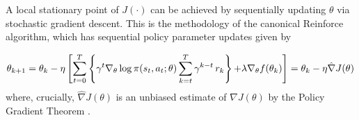 \documentclass[journal,onecolumn]{IEEEtran}
\newcommand{\thk}{\theta_k}
\newcommand{\thkk}{\theta_{k+1}}
\newcommand{\grad}{\nabla}
\newcommand{\gradn}{\hat{\nabla}}
\newcommand{\rew}{J}
\newcommand{\reals}{\mathbb{R}}
\newcommand{\CE}{\mathbb{E}}
\newcommand{\N}{\mathbb{N}}
\newcommand{\CS}{\mathcal{S}}
\newcommand{\CA}{\mathcal{A}}
\begin{document}



A local stationary point of $\rew(\cdot)$ can be achieved by sequentially updating $\theta$ via stochastic gradient descent. This is the methodology of the canonical Reinforce algorithm, which has sequential policy parameter updates given by

\begin{equation}
\label{alg:reinf}
\thkk = \thk - \eta\left[\sum_{t=0}^T\left\{\gamma^t\grad_{\theta}\log\pi(s_t,a_t;\theta)\sum_{k=t}^T \gamma^{k-t}\,r_k\right\}\textcolor{black}{ 
+\lambda \nabla_{\theta}f(\thk)}\right] = \thk - \eta\gradn J(\theta)
\end{equation}
where, crucially, $\gradn J(\theta)$ is an unbiased estimate of $\grad J(\theta)$ by the Policy Gradient Theorem \cite{sutton1999policy}. 
\end{document}
